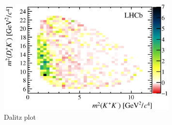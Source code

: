 \begin{figure}[!h]
    \centering
    \includegraphics[width=0.8\textwidth]{figs/B2DsKK/Dalitz_plot_sweighted.eps}
    \caption{Dalitz plot}
    \label{fig:B2DsKK_Dalitzplot}   
\end{figure}

